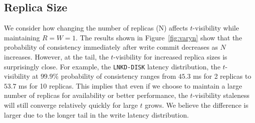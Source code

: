 \documentclass{vldb}
\newcommand{\subsectionskip}{-0em}
\begin{document}
\vspace{\subsectionskip}\subsection{Replica Size}

We consider how changing the number of replicas (N) affects
$t$-visibility while maintaining $R$$=$$W$$=$$1$. The results shown in
Figure~\ref{fig:varyn} show that the probability of consistency
immediately after write commit decreases as $N$ increases.  However,
at the tail, the $t$-visibility for increased replica sizes is
surprisingly close.  For example, the \texttt{LNKD-DISK} latency
distribution, the $t$-visibility at $99.9\%$ probability of
consistency ranges from $45.3$ ms for 2 replicas to $53.7$ ms for 10
replicas.  This implies that even if we choose to maintain a large
number of replicas for availability or better performance, the
$t$-visibility staleness will still converge relatively quickly for large $t$
grows. We believe the difference is larger due to the longer tail in
the write latency distribution.
\end{document}
